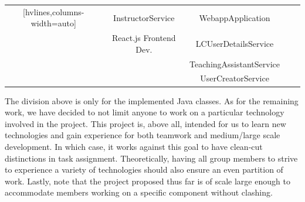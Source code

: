 \documentclass[a4paper, 12pt]{article}
\begin{document}
\begin{table}[ht]
{\begin{NiceTabular}{ccccc}[hvlines,columns-width=auto]
             & InstructorService & WebappApplication &  &  \\

             & React.js Frontend Dev. & LCUserDetailsService &  &  \\

             &  & TeachingAssistantService &  &  \\

             &  & UserCreatorService &  &  \\

            \end{NiceTabular} }

    \end{table}

    The division above is only for the implemented Java classes.
    As for the remaining work, we have decided to not limit anyone to work on a particular technology
    involved in the project. This project is, above all, intended for us to learn new technologies
    and gain experience for both teamwork and medium/large scale development. In which case, it works
    against this goal to have clean-cut distinctions in task assignment.
    Theoretically, having all group members to strive to experience a variety of technologies should also ensure an even
    partition of work. Lastly, note that the project proposed thus far is of scale large enough to accommodate
    members working on a specific component without clashing.
\end{document}
